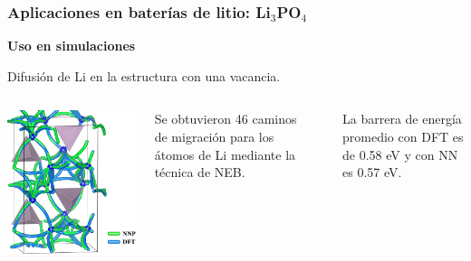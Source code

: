\documentclass[aspectratio=169]{beamer}
\let\oldtextbf\textbf
\renewcommand{\textbf}[1]{\textcolor{nordblue}{\oldtextbf{#1}}}
\begin{document}
    \begin{frame}
        \frametitle{Aplicaciones en baterías de litio: Li$_3$PO$_4$}
            
        \textbf{Uso en simulaciones}

        Difusión de Li en la estructura con una vacancia.
        
        \begin{columns}
            \begin{center}
                \includegraphics[width=\columnwidth]{Li3PO4-neb.png}
            \end{center}

            Se obtuvieron 46 caminos de migración para los átomos de Li mediante
            la técnica de NEB.

            \ \pause

            La barrera de energía promedio con DFT es de 0.58 eV y con NN es 
            0.57 eV.
        \end{columns}

    \end{frame}
    
\end{document}
